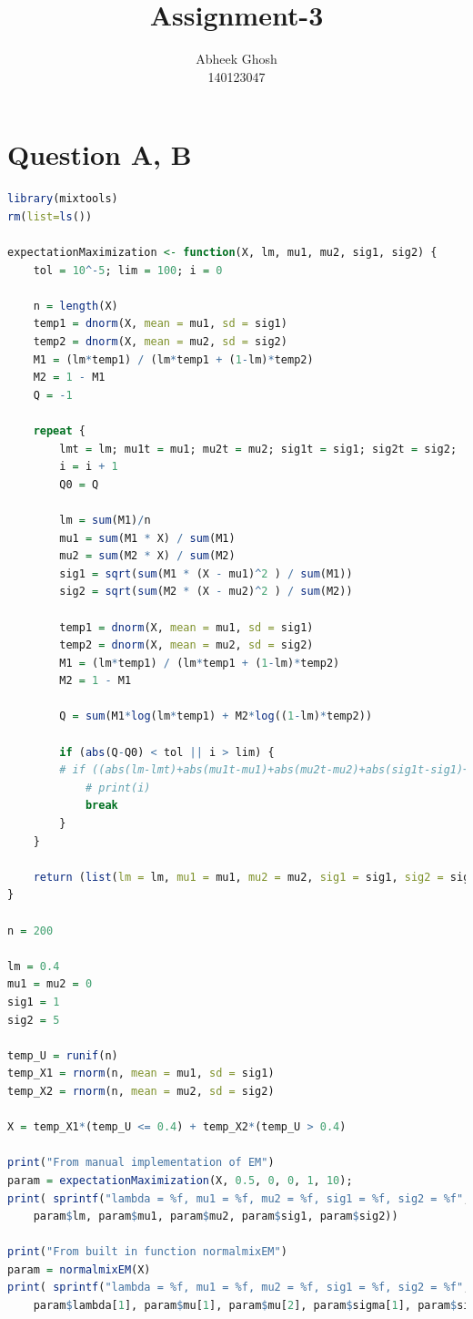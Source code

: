 \documentclass{article}
\begin{document}
	\title{\textbf{Assignment-3}}
	\author{Abheek Ghosh \\ 
		140123047 }
	
	\maketitle
	

\section{Question A, B}


\begin{lstlisting}[language=R]
library(mixtools)
rm(list=ls())

expectationMaximization <- function(X, lm, mu1, mu2, sig1, sig2) {
	tol = 10^-5; lim = 100; i = 0

	n = length(X)
	temp1 = dnorm(X, mean = mu1, sd = sig1)
	temp2 = dnorm(X, mean = mu2, sd = sig2)
	M1 = (lm*temp1) / (lm*temp1 + (1-lm)*temp2)
	M2 = 1 - M1
	Q = -1

	repeat {
		lmt = lm; mu1t = mu1; mu2t = mu2; sig1t = sig1; sig2t = sig2;
		i = i + 1
		Q0 = Q

		lm = sum(M1)/n
		mu1 = sum(M1 * X) / sum(M1)
		mu2 = sum(M2 * X) / sum(M2)
		sig1 = sqrt(sum(M1 * (X - mu1)^2 ) / sum(M1))
		sig2 = sqrt(sum(M2 * (X - mu2)^2 ) / sum(M2))

		temp1 = dnorm(X, mean = mu1, sd = sig1)
		temp2 = dnorm(X, mean = mu2, sd = sig2)
		M1 = (lm*temp1) / (lm*temp1 + (1-lm)*temp2)
		M2 = 1 - M1

		Q = sum(M1*log(lm*temp1) + M2*log((1-lm)*temp2))

		if (abs(Q-Q0) < tol || i > lim) {
		# if ((abs(lm-lmt)+abs(mu1t-mu1)+abs(mu2t-mu2)+abs(sig1t-sig1)+abs(sig2t-sig2) < tol)) {
			# print(i)
			break
		}
	}

	return (list(lm = lm, mu1 = mu1, mu2 = mu2, sig1 = sig1, sig2 = sig2))
}

n = 200

lm = 0.4
mu1 = mu2 = 0
sig1 = 1
sig2 = 5

temp_U = runif(n)
temp_X1 = rnorm(n, mean = mu1, sd = sig1)
temp_X2 = rnorm(n, mean = mu2, sd = sig2)

X = temp_X1*(temp_U <= 0.4) + temp_X2*(temp_U > 0.4)

print("From manual implementation of EM")
param = expectationMaximization(X, 0.5, 0, 0, 1, 10);
print( sprintf("lambda = %f, mu1 = %f, mu2 = %f, sig1 = %f, sig2 = %f", 
	param$lm, param$mu1, param$mu2, param$sig1, param$sig2))

print("From built in function normalmixEM")
param = normalmixEM(X)
print( sprintf("lambda = %f, mu1 = %f, mu2 = %f, sig1 = %f, sig2 = %f", 
	param$lambda[1], param$mu[1], param$mu[2], param$sigma[1], param$sigma[2]))
\end{lstlisting}
\end{document}
